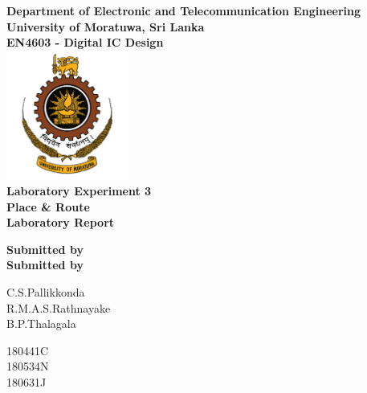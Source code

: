 \begin{titlepage}
\center %

\textbf{\large Department of Electronic and Telecommunication Engineering}\\[0.5cm]
\textbf{\Large University of Moratuwa, Sri Lanka}\\[1cm]
\textbf{\large EN4603 - Digital IC Design}\\[2cm]
\includegraphics[width=0.3\textwidth]{figures/uomlogo}\\[2cm]

	
\textbf{\Huge Laboratory Experiment 3 \\ Place \& Route }\\[0.2cm]
\textbf{\Large Laboratory Report}\\[3cm]




\vfill

\textbf{\large Submitted by}\\[0.5cm]

\textbf{\large Submitted by}\\[2mm]
\begin{minipage}{0.3\textwidth}
	\begin{flushleft}
		{\large C.S.Pallikkonda}\\[2mm]
		{\large R.M.A.S.Rathnayake }\\[2mm]
		{\large B.P.Thalagala }\\[2mm]		
		
	\end{flushleft}
\end{minipage}
\hspace{2mm}
\begin{minipage}{0.2\textwidth}
	\begin{flushright}
		{\large 180441C }\\[2mm]
		{\large 180534N }\\[2mm]
		{\large 180631J }\\[2mm]


\end{flushright}
\end{minipage}
\end{titlepage}
